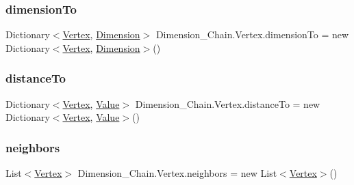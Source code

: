 \subsubsection{\texorpdfstring{dimension\+To}{dimensionTo}}
{\footnotesize\ttfamily Dictionary$<$\mbox{\hyperlink{class_dimension___chain_1_1_vertex}{Vertex}}, \mbox{\hyperlink{class_dimension___chain_1_1_dimension}{Dimension}}$>$ Dimension\+\_\+\+Chain.\+Vertex.\+dimension\+To = new Dictionary$<$\mbox{\hyperlink{class_dimension___chain_1_1_vertex}{Vertex}}, \mbox{\hyperlink{class_dimension___chain_1_1_dimension}{Dimension}}$>$()}

\mbox{\label{class_dimension___chain_1_1_vertex_a4143488432955c4f229b0329ab8cd6e1}} 
\subsubsection{\texorpdfstring{distance\+To}{distanceTo}}
{\footnotesize\ttfamily Dictionary$<$\mbox{\hyperlink{class_dimension___chain_1_1_vertex}{Vertex}}, \mbox{\hyperlink{class_dimension___chain_1_1_value}{Value}}$>$ Dimension\+\_\+\+Chain.\+Vertex.\+distance\+To = new Dictionary$<$\mbox{\hyperlink{class_dimension___chain_1_1_vertex}{Vertex}}, \mbox{\hyperlink{class_dimension___chain_1_1_value}{Value}}$>$()}

\mbox{\label{class_dimension___chain_1_1_vertex_a88374fb71c7e0c494307b501cf1cd3bd}} 
\subsubsection{\texorpdfstring{neighbors}{neighbors}}
{\footnotesize\ttfamily List$<$\mbox{\hyperlink{class_dimension___chain_1_1_vertex}{Vertex}}$>$ Dimension\+\_\+\+Chain.\+Vertex.\+neighbors = new List$<$\mbox{\hyperlink{class_dimension___chain_1_1_vertex}{Vertex}}$>$()}

\mbox{\label{class_dimension___chain_1_1_vertex_aa803e8c5e381e30ad498686633a3a4ae}} 
